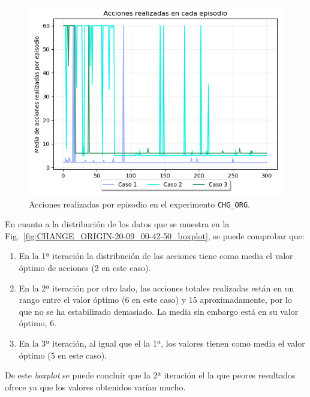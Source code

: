 \begin{figure}
    \centering
    \includegraphics[scale=0.4]{cap5_experimentacion/images/CHANGE_ORIGIN-20-09_00-42-50_acciones.png}
    \caption{Acciones realizadas por episodio en el experimento \texttt{CHG\_ORG}.}
    \label{fig:CHANGE_ORIGIN-20-09_00-42-50_acciones}
\end{figure}

En cuanto a la distribución de los datos que se muestra en la Fig.~\ref{fig:CHANGE_ORIGIN-20-09_00-42-50_boxplot}, se puede comprobar que: 
\begin{enumerate}
    \item En la 1ª iteración la distribución de las acciones tiene como media el valor óptimo de acciones (2 en este caso). 
    \item En la 2ª iteración por otro lado, las acciones totales realizadas están en un rango entre el valor óptimo (6 en este caso) y 15 aproximadamente, por lo que no se ha estabilizado demasiado. La media sin embargo está en su valor óptimo, 6. 
    \item En la 3ª iteración, al igual que el la 1ª, los valores tienen como media el valor óptimo (5 en este caso).
\end{enumerate}

De este \textit{boxplot} se puede concluir que la 2ª iteración el la que peores resultados ofrece ya que los valores obtenidos varían mucho. \\

